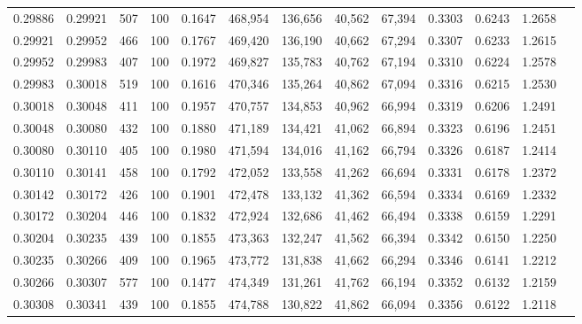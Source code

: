 \begin{tabular}{rrrrrrrrrrrrr}
0.29886 & 0.29921 &   507 & 100 &                                     0.1647 & 468,954 & 136,656 &  40,562 &  67,394 & 0.3303 & 0.6243 & 1.2658 \\
0.29921 & 0.29952 &   466 & 100 &                                     0.1767 & 469,420 & 136,190 &  40,662 &  67,294 & 0.3307 & 0.6233 & 1.2615 \\
0.29952 & 0.29983 &   407 & 100 &                                     0.1972 & 469,827 & 135,783 &  40,762 &  67,194 & 0.3310 & 0.6224 & 1.2578 \\
0.29983 & 0.30018 &   519 & 100 &                                     0.1616 & 470,346 & 135,264 &  40,862 &  67,094 & 0.3316 & 0.6215 & 1.2530 \\
0.30018 & 0.30048 &   411 & 100 &                                     0.1957 & 470,757 & 134,853 &  40,962 &  66,994 & 0.3319 & 0.6206 & 1.2491 \\
0.30048 & 0.30080 &   432 & 100 &                                     0.1880 & 471,189 & 134,421 &  41,062 &  66,894 & 0.3323 & 0.6196 & 1.2451 \\
0.30080 & 0.30110 &   405 & 100 &                                     0.1980 & 471,594 & 134,016 &  41,162 &  66,794 & 0.3326 & 0.6187 & 1.2414 \\
0.30110 & 0.30141 &   458 & 100 &                                     0.1792 & 472,052 & 133,558 &  41,262 &  66,694 & 0.3331 & 0.6178 & 1.2372 \\
0.30142 & 0.30172 &   426 & 100 &                                     0.1901 & 472,478 & 133,132 &  41,362 &  66,594 & 0.3334 & 0.6169 & 1.2332 \\
0.30172 & 0.30204 &   446 & 100 &                                     0.1832 & 472,924 & 132,686 &  41,462 &  66,494 & 0.3338 & 0.6159 & 1.2291 \\
0.30204 & 0.30235 &   439 & 100 &                                     0.1855 & 473,363 & 132,247 &  41,562 &  66,394 & 0.3342 & 0.6150 & 1.2250 \\
0.30235 & 0.30266 &   409 & 100 &                                     0.1965 & 473,772 & 131,838 &  41,662 &  66,294 & 0.3346 & 0.6141 & 1.2212 \\
0.30266 & 0.30307 &   577 & 100 &                                     0.1477 & 474,349 & 131,261 &  41,762 &  66,194 & 0.3352 & 0.6132 & 1.2159 \\
0.30308 & 0.30341 &   439 & 100 &                                     0.1855 & 474,788 & 130,822 &  41,862 &  66,094 & 0.3356 & 0.6122 & 1.2118 \\

\end{tabular}
